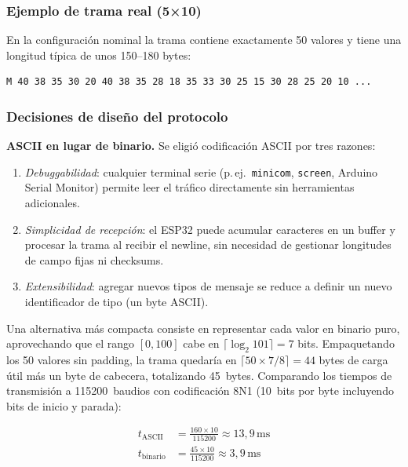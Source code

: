 \subsubsection{Ejemplo de trama real (5×10)}

En la configuración nominal la trama contiene exactamente 50 valores y
tiene una longitud típica de unos 150--180 bytes:

\begin{verbatim}
M 40 38 35 30 20 40 38 35 28 18 35 33 30 25 15 30 28 25 20 10 ...
\end{verbatim}

\subsubsection{Decisiones de diseño del protocolo}

\textbf{ASCII en lugar de binario.}
Se eligió codificación ASCII por tres razones:
\begin{enumerate}
  \item \emph{Debuggabilidad}: cualquier terminal serie (p.\,ej.\
        \texttt{minicom}, \texttt{screen}, Arduino Serial Monitor) permite
        leer el tráfico directamente sin herramientas adicionales.
  \item \emph{Simplicidad de recepción}: el ESP32 puede acumular caracteres
        en un buffer y procesar la trama al recibir el newline, sin necesidad
        de gestionar longitudes de campo fijas ni checksums.
  \item \emph{Extensibilidad}: agregar nuevos tipos de mensaje se reduce a
        definir un nuevo identificador de tipo (un byte ASCII).
\end{enumerate}

Una alternativa más compacta consiste en representar cada valor en binario
puro, aprovechando que el rango $[0, 100]$ cabe en $\lceil \log_2 101 \rceil = 7$
bits. Empaquetando los 50 valores sin padding, la trama quedaría en
$\lceil 50 \times 7 / 8 \rceil = 44$ bytes de carga útil más un byte de
cabecera, totalizando 45~bytes. Comparando los tiempos de transmisión a
115200~baudios con codificación 8N1 (10~bits por byte incluyendo bits de
inicio y parada):

\begin{align}
  t_{\mathrm{ASCII}}  &= \frac{160 \times 10}{115200} \approx 13{,}9\,\mathrm{ms} \\[4pt]
  t_{\mathrm{binario}} &= \frac{45 \times 10}{115200}  \approx  3{,}9\,\mathrm{ms}
\end{align}

